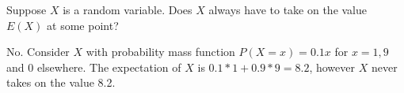 \question Suppose $X$ is a random variable. Does $X$ always have to take on the value $E(X)$ at some point?
\begin{solution}[2cm]
No. Consider $X$ with probability mass function $P(X = x) = 0.1x$ for $x = 1, 9$ and $0$ elsewhere. The expectation of $X$ is $0.1 * 1 + 0.9 * 9 = 8.2$, however $X$ never takes on the value 8.2.
\end{solution}